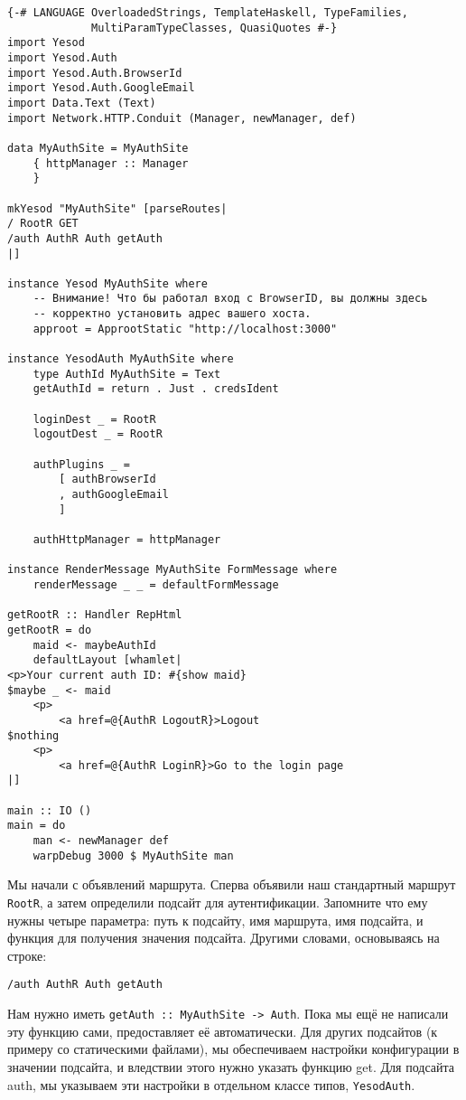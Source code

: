 \begin{lstlisting}
{-# LANGUAGE OverloadedStrings, TemplateHaskell, TypeFamilies,
             MultiParamTypeClasses, QuasiQuotes #-}
import Yesod
import Yesod.Auth
import Yesod.Auth.BrowserId
import Yesod.Auth.GoogleEmail
import Data.Text (Text)
import Network.HTTP.Conduit (Manager, newManager, def)

data MyAuthSite = MyAuthSite
    { httpManager :: Manager
    }

mkYesod "MyAuthSite" [parseRoutes|
/ RootR GET
/auth AuthR Auth getAuth
|]

instance Yesod MyAuthSite where
    -- Внимание! Что бы работал вход с BrowserID, вы должны здесь
    -- корректно установить адрес вашего хоста.
    approot = ApprootStatic "http://localhost:3000"

instance YesodAuth MyAuthSite where
    type AuthId MyAuthSite = Text
    getAuthId = return . Just . credsIdent

    loginDest _ = RootR
    logoutDest _ = RootR

    authPlugins _ =
        [ authBrowserId
        , authGoogleEmail
        ]

    authHttpManager = httpManager

instance RenderMessage MyAuthSite FormMessage where
    renderMessage _ _ = defaultFormMessage

getRootR :: Handler RepHtml
getRootR = do
    maid <- maybeAuthId
    defaultLayout [whamlet|
<p>Your current auth ID: #{show maid}
$maybe _ <- maid
    <p>
        <a href=@{AuthR LogoutR}>Logout
$nothing
    <p>
        <a href=@{AuthR LoginR}>Go to the login page
|]

main :: IO ()
main = do
    man <- newManager def
    warpDebug 3000 $ MyAuthSite man
\end{lstlisting}

Мы начали с объявлений маршрута. Сперва объявили наш стандартный маршрут \lstinline'RootR', а затем определили подсайт для аутентификации. Запомните что ему нужны четыре параметра: путь к подсайту, имя маршрута, имя подсайта, и функция для получения значения подсайта. Другими словами, основываясь на строке:

\begin{lstlisting}
/auth AuthR Auth getAuth
\end{lstlisting}

Нам нужно иметь \lstinline'getAuth :: MyAuthSite -> Auth'. Пока мы ещё не написали эту функцию сами,  предоставляет её автоматически. Для других подсайтов (к примеру со статическими файлами), мы обеспечиваем настройки конфигурации в значении подсайта, и вледствии этого нужно указать функцию get. Для подсайта auth, мы указываем эти настройки в отдельном классе типов, \lstinline'YesodAuth'.

